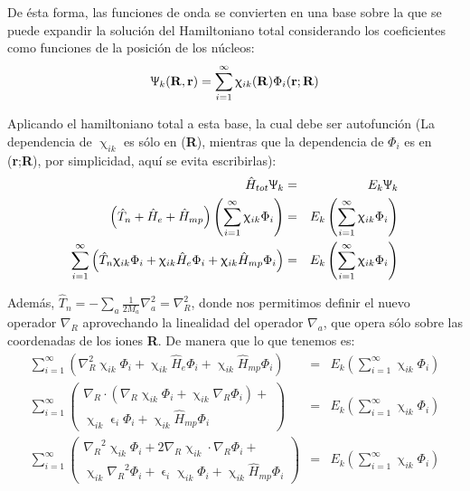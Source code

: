 \documentclass [11pt]{article}
\begin{document}
De ésta forma, las funciones de onda se convierten en una base sobre la que se puede expandir la solución del Hamiltoniano total considerando los coeficientes como funciones de la posición de los núcleos:
\begin{equation}
    \Uppsi_k({\bf R},{\bf r})=\sum_{i=1}^{\infty}\upchi_{ik}({\bf R})\Phi_i({\bf r};{\bf R})
\end{equation}


Aplicando el hamiltoniano total a esta base, la cual debe ser autofunción (La dependencia de $\upchi_{ik}$ es sólo en ({\bf R}), mientras que la dependencia de $\Phi_i$ es en ({\bf r};{\bf R}), por simplicidad, aquí se evita escribirlas):
\begin{eqnarray}
    \hat H_{tot}\Uppsi_k & = & E_k\Uppsi_k\\
    \left({\hat T}_n+{\hat H}_e+{\hat H}_{mp}\right)\left(\sum_{i=1}^{\infty}\upchi_{ik}\Phi_i\right) & = & E_k \left(\sum_{i=1}^{\infty}\upchi_{ik}\Phi_i\right)\\
    \sum_{i=1}^{\infty}\left({\hat T}_n\upchi_{ik}\Phi_i+\upchi_{ik}{\hat H}_e\Phi_i+\upchi_{ik}{\hat H}_{mp}\Phi_i\right) & = & E_k \left(\sum_{i=1}^{\infty}\upchi_{ik}\Phi_i\right)
\end{eqnarray}

Además, $\hat T_n=-\sum_{a}\frac{1}{2M_{a}}\nabla_a^2=\nabla_R^2$, donde nos permitimos definir el nuevo operador $\nabla_R$ aprovechando la linealidad del operador $\nabla_a$, que opera sólo sobre las coordenadas de los iones {\bf R}. De manera que lo que tenemos es:
\begin{eqnarray}
    \sum_{i=1}^{\infty}\left({\nabla_R^2}\upchi_{ik}\Phi_i+\upchi_{ik}{\hat H}_e\Phi_i+\upchi_{ik}{\hat H}_{mp}\Phi_i\right) & = & E_k \left(\sum_{i=1}^{\infty}\upchi_{ik}\Phi_i\right)\\
    \sum_{i=1}^{\infty}\left(\begin{array}{cc}
         {\nabla_R}\cdot({\nabla_R}\upchi_{ik}\Phi_i+\upchi_{ik}{\nabla_R}\Phi_i)+\\
         \upchi_{ik}  \upvarepsilon_i
 \Phi_i+\upchi_{ik}{\hat H}_{mp}\Phi_i
    \end{array}\right) & = & E_k \left(\sum_{i=1}^{\infty}\upchi_{ik}\Phi_i\right)\\
    \sum_{i=1}^{\infty}\left(\begin{array}{cc}
         {\nabla_R}^2\upchi_{ik}\Phi_i+2{\nabla_R}\upchi_{ik}\cdot {\nabla_R}\Phi_i+\\
         \upchi_{ik}{\nabla_R}^2\Phi_i+\upvarepsilon_i\upchi_{ik}\Phi_i+\upchi_{ik}{\hat H}_{mp}\Phi_i
    \end{array}\right) & = & E_k \left(\sum_{i=1}^{\infty}\upchi_{ik}\Phi_i\right)
\end{eqnarray}\\
\end{document}
